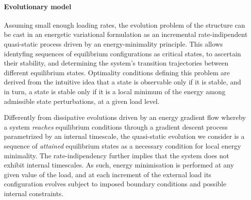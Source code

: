 \documentclass[10pt]{article}
\begin{document}
\paragraph{Evolutionary model}

Assuming small enough loading rates,
the evolution problem of the structure can be cast in an energetic variational formulation as an incremental rate-indipendent quasi-static process driven by an energy-minimality principle.
This allows identyfing sequences of equilibrium configurations as critical states, to ascertain their stability, and determining the system's transition trajectories between different equilibrium states.
Optimality conditions defining this problem are derived from the
intuitive idea that a state is observable only if it is stable, and in turn, a state is stable only if it is a local minimum of the energy among admissible state perturbations, at a given load level.

Differently from dissipative evolutions driven by an energy gradient flow whereby a system \emph{reaches} equilibrium conditions through a gradient descent process parametrized by an internal timescale, the quasi-static evolution we consider is a sequence of \emph{attained} equilibrium states as a necessary condition for local energy minimality.
The rate-indipendency further implies that the system does not exhibit internal timescales.
As such, energy minimisation is performed at any given value of the load, and at each increment of the external load its configuration evolves subject to imposed boundary conditions and possible internal constraints.
%
%
%
\end{document}
